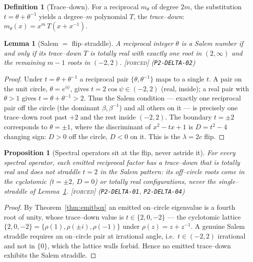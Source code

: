 \documentclass[11pt]{article}
\theoremstyle{plain}
\newtheorem{proposition}[theorem]{Proposition}
\newtheorem{lemma}[theorem]{Lemma}
\theoremstyle{definition}
\newtheorem{definition}[theorem]{Definition}
\theoremstyle{remark}
\newcommand{\forced}{\textcolor{forcedc}{\textsc{[forced]}}}
\begin{document}
\begin{definition}[Trace--down]\label{def:tracedown}
For a reciprocal $m_\theta$ of degree $2m$, the substitution $t=\theta+\theta^{-1}$ yields a degree--$m$ polynomial $T$, the \emph{trace--down}: $m_\theta(x)=x^m\,T(x+x^{-1})$.
\end{definition}

\begin{lemma}[Salem $=$ flip--straddle]\label{lem:salemflip}
A reciprocal integer $\theta$ is a Salem number if and only if its trace--down $T$ is totally real with exactly one root in $(2,\infty)$ and the remaining $m-1$ roots in $(-2,2)$. \forced{} {\small(\texttt{P2-DELTA-02})}
\end{lemma}
\begin{proof}
Under $t=\theta+\theta^{-1}$ a reciprocal pair $\{\theta,\theta^{-1}\}$ maps to a single $t$. A pair on the unit circle, $\theta=e^{i\psi}$, gives $t=2\cos\psi\in(-2,2)$ (real, inside); a real pair with $\theta>1$ gives $t=\theta+\theta^{-1}>2$. Thus the Salem condition --- exactly one reciprocal pair off the circle (the dominant $\beta,\beta^{-1}$) and all others on it --- is precisely one trace--down root past $+2$ and the rest inside $(-2,2)$. The boundary $t=\pm2$ corresponds to $\theta=\pm1$, where the discriminant of $x^2-tx+1$ is $D=t^2-4$ changing sign: $D>0$ off the circle, $D<0$ on it. This is the $\lambda=2c$ flip.
\end{proof}

\begin{proposition}[Spectral operators sit at the flip, never astride it]\label{prop:specflip}
For every spectral operator, each emitted reciprocal factor has a trace--down that is totally real and does \emph{not} straddle $t=2$ in the Salem pattern: its off--circle roots come in the cyclotomic ($t=\pm2$, $D=0$) or totally real configurations, never the single--straddle of Lemma~\ref{lem:salemflip}. \forced{} {\small(\texttt{P2-DELTA-01}, \texttt{P2-DELTA-04})}
\end{proposition}
\begin{proof}
By Theorem~\ref{thm:emitbox} an emitted on--circle eigenvalue is a fourth root of unity, whose trace--down value is $t\in\{2,0,-2\}$ --- the cyclotomic lattice $\{2,0,-2\}=\{\rho(1),\rho(\pm i),\rho(-1)\}$ under $\rho(z)=z+z^{-1}$. A genuine Salem straddle requires an on--circle pair at irrational angle, i.e.\ $t\in(-2,2)$ irrational and not in $\{0\}$, which the lattice walls forbid. Hence no emitted trace--down exhibits the Salem straddle.
\end{proof}
\end{document}
